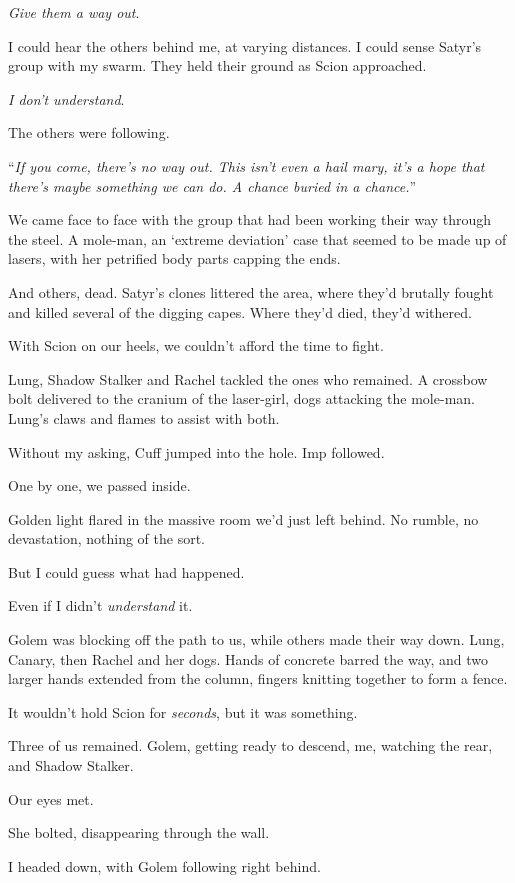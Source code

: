 \emph{Give them a way out}.



I could hear the others behind me, at varying distances.  I could sense Satyr's group with my swarm.  They held their ground as Scion approached.



\emph{I don't understand}.



The others were following.



``\emph{If you come, there's no way out.  This isn't even a hail mary, it's a hope that there's maybe something we can do.  A chance buried in a chance.}''



We came face to face with the group that had been working their way through the steel.  A mole-man, an `extreme deviation' case that seemed to be made up of lasers, with her petrified body parts capping the ends.



And others, dead.  Satyr's clones littered the area, where they'd brutally fought and killed several of the digging capes.  Where they'd died, they'd withered.



With Scion on our heels, we couldn't afford the time to fight.



Lung, Shadow Stalker and Rachel tackled the ones who remained.  A crossbow bolt delivered to the cranium of the laser-girl, dogs attacking the mole-man.  Lung's claws and flames to assist with both.



Without my asking, Cuff jumped into the hole.  Imp followed.



One by one, we passed inside.



Golden light flared in the massive room we'd just left behind.  No rumble, no devastation, nothing of the sort.



But I could guess what had happened.



Even if I didn't \emph{understand} it.



Golem was blocking off the path to us, while others made their way down.  Lung, Canary, then Rachel and her dogs.  Hands of concrete barred the way, and two larger hands extended from the column, fingers knitting together to form a fence.



It wouldn't hold Scion for \emph{seconds}, but it was something.



Three of us remained.  Golem, getting ready to descend, me, watching the rear, and Shadow Stalker.



Our eyes met.



She bolted, disappearing through the wall.



I headed down, with Golem following right behind.





